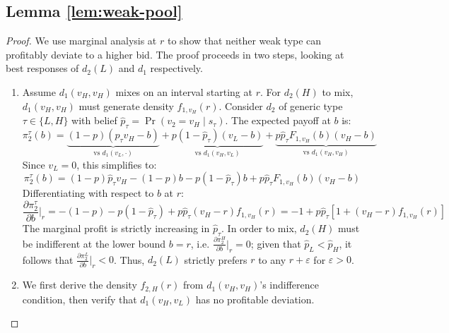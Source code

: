 \documentclass[11pt]{article}
\theoremstyle{plain}
\theoremstyle{definition}
\theoremstyle{plain}
\theoremstyle{plain}
\theoremstyle{plain}
\theoremstyle{plain}
\numberwithin{equation}{section}
\begin{document}
\iffalse
\subsection*{Lemma \ref{lem:weak-pool}}

\begin{proof}
We use marginal analysis at $r$ to show that neither weak type can profitably deviate to a higher bid. The proof proceeds in two steps, looking at best responses of $d_2(L)$ and $d_1$ respectively.

\begin{enumerate}
    \item Assume $d_1(v_H,v_H)$ mixes on an interval starting at $r$. For $d_2(H)$ to mix, $d_1(v_H,v_H)$ must generate density $f_{1,v_H}(r)$. Consider $d_2$ of generic type $\tau \in \{L, H\}$ with belief $\hat{p}_\tau = \Pr(v_2=v_H \mid s_\tau)$. The expected payoff at $b$ is:
\[
\pi^\tau_2(b) = \underbrace{(1-p)(\hat{p}_\tau v_H - b)}_{\text{vs } d_1(v_L, \cdot)} + \underbrace{p(1-\hat{p}_\tau)(v_L-b)}_{\text{vs } d_1(v_H,v_L)} + \underbrace{p\hat{p}_\tau F_{1,v_H}(b)(v_H-b)}_{\text{vs } d_1(v_H,v_H)}
\]
Since $v_L = 0$, this simplifies to:
\[
\pi^\tau_2(b) = (1-p)\hat{p}_\tau v_H - (1-p)b - p(1-\hat{p}_\tau)b + p\hat{p}_\tau F_{1,v_H}(b)(v_H-b)
\]
Differentiating with respect to $b$ at $r$:
\[
\frac{\partial \pi^\tau_2}{\partial b}\bigg|_{r} = -(1-p) - p(1-\hat{p}_\tau) + p\hat{p}_\tau (v_H-r) f_{1,v_H}(r) = -1 + p\hat{p}_\tau \left[ 1 + (v_H-r)f_{1,v_H}(r) \right]
\]
The marginal profit is strictly increasing in $\hat{p}_\tau$. In order to mix, $d_2(H)$ must be indifferent at the lower bound $b = r$, i.e. $\frac{\partial \pi^H_2}{\partial b}|_{r} = 0$; given that $\hat{p}_L < \hat{p}_H$, it follows that $\frac{\partial \pi^L_2}{\partial b}|_{r} < 0$. Thus, $d_2(L)$ strictly prefers $r$ to any $r+\varepsilon$ for $\varepsilon > 0$.
\item We first derive the density $f_{2,H}(r)$ from $d_1(v_H,v_H)$'s indifference condition, then verify that $d_1(v_H,v_L)$ has no profitable deviation.


\end{enumerate}
\end{proof}
\end{document}
